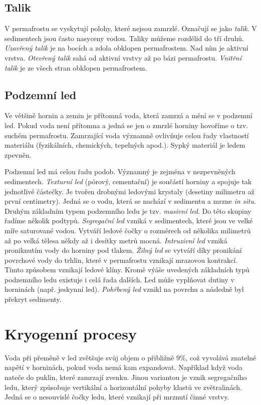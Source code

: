 \subsection{Talik}
V permafrostu se vyskytují polohy, které nejsou zamrzlé. Označují se jako \emph{talik}. V sedimentech jsou často nasyceny vodou. Taliky můžeme rozdělid do tří druhů. \emph{Uzavřený talik} je na bocích a zdola obklopen permafrostem. Nad ním je aktivní vrstva. \emph{Otevřený talik} sahá od aktivní vrstvy až po bázi permafrostu. \emph{Vnitřní talik} je ze všech stran obklopen permafrostem. 

\subsection{Podzemní led}
Ve většině hornin a zemin je přítomná voda, která zamrzá a mění se v podzemní led. Pokud voda není přítomna a jedná se jen o zmrzlé horniny hovoříme o tzv. suchém permafrostu. Zamrzající voda významně ovlivňuje celou řady vlastností materiálu (fyzikálních, chemických, tepelných apod.). Sypký materiál je ledem zpevněn.

Podzemní led má celou řadu podob. Významný je zejména v nezpevněných sedimentech.  \emph{Texturní led} (pórový, cementační) je součástí horniny a spojuje tak jednotlivé částečky. Je tvořen drobnými ledovými krystaly (desetiny milimetru až první centimetry). Jedná se o vodu, která se nachází v sedimentu a mrzne \textit{in situ}. Druhým základním typem podzemního ledu je tzv. \emph{masivní led}. Do této skupiny řadíme několik podtypů. \emph{Segregační led} vzniká v sedimentech, které jsou ve velké míře saturované vodou. Vytváří ledové čočky o rozměrech od několika milimetrů až po velká tělesa někdy až i desítky metrů mocná. \emph{Intruzivní led} vzniká proniknutím vody do horniny pod tlakem. \emph{Žilný led} se vytváří díky pronikání povrchové vody do trhlin, které v permafrostu vznikají mrazovou kontrakcí. Tímto způsobem vznikají ledové klíny. Kromě výáše uvedených základních typů podzemního ledu existuje i celá řada dalších. Led může vyplňovat dutiny v horninách (např. jeskynní led). \emph{Pohřbený led} vznikl na povrchu a následně byl překryt sedimenty.

\section{Kryogenní procesy}
Voda při přeměně v led zvětšuje svůj objem o přibližně $9 \%$, což vyvolává znatelné napětí v horninách, pokud voda nemá kam expandovat. Například když voda nateče do puklin, které zamrzají zvenku. Jinou variantou je vznik segregačního ledu, který způsobuje vertikální a horizontální pohyby klastů ve zvětralinách. Jedná se o nesouvislé čočky ledu, které vznikají při mrznutí činné vrstvy. 

